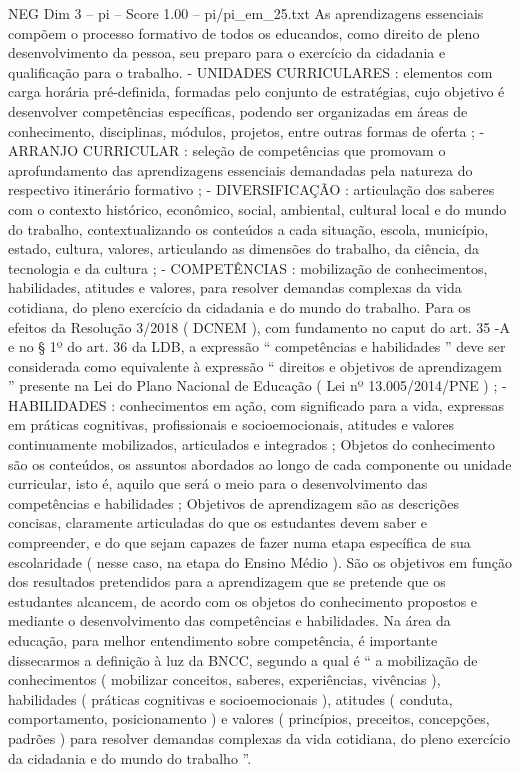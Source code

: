 \begin{textsample}{NEG Dim 3 – pi – Score 1.00 – pi/pi\_em\_25.txt}
As aprendizagens essenciais compõem o processo formativo de todos os educandos, como direito de pleno desenvolvimento da pessoa, seu preparo para o exercício da cidadania e qualificação para o trabalho. - UNIDADES CURRICULARES : elementos com carga horária pré-definida, formadas pelo conjunto de estratégias, cujo objetivo é desenvolver competências específicas, podendo ser organizadas em áreas de conhecimento, disciplinas, módulos, projetos, entre outras formas de oferta ; - ARRANJO CURRICULAR : seleção de competências que promovam o aprofundamento das aprendizagens essenciais demandadas pela natureza do respectivo itinerário formativo ; - DIVERSIFICAÇÃO : articulação dos saberes com o contexto histórico, econômico, social, ambiental, cultural local e do mundo do trabalho, contextualizando os conteúdos a cada situação, escola, município, estado, cultura, valores, articulando as dimensões do trabalho, da ciência, da tecnologia e da cultura ; - COMPETÊNCIAS : mobilização de conhecimentos, habilidades, atitudes e valores, para resolver demandas complexas da vida cotidiana, do pleno exercício da cidadania e do mundo do trabalho.
Para os efeitos da Resolução 3/2018 ( DCNEM ), com fundamento no caput do art. 35 -A e no § 1º do art. 36 da LDB, a expressão “ competências e habilidades ” deve ser considerada como equivalente à expressão “ direitos e objetivos de aprendizagem ” presente na Lei do Plano Nacional de Educação ( Lei nº 13.005/2014/PNE ) ; - HABILIDADES : conhecimentos em ação, com significado para a vida, expressas em práticas cognitivas, profissionais e socioemocionais, atitudes e valores continuamente mobilizados, articulados e integrados ; Objetos do conhecimento são os conteúdos, os assuntos abordados ao longo de cada componente ou unidade curricular, isto é, aquilo que será o meio para o desenvolvimento das competências e habilidades ; Objetivos de aprendizagem são as descrições concisas, claramente articuladas do que os estudantes devem saber e compreender, e do que sejam capazes de fazer numa etapa específica de sua escolaridade ( nesse caso, na etapa do Ensino Médio ).
São os objetivos em função dos resultados pretendidos para a aprendizagem que se pretende que os estudantes alcancem, de acordo com os objetos do conhecimento propostos e mediante o desenvolvimento das competências e habilidades.
Na área da educação, para melhor entendimento sobre competência, é importante dissecarmos a definição à luz da BNCC, segundo a qual é “ a mobilização de conhecimentos ( mobilizar conceitos, saberes, experiências, vivências ), habilidades ( práticas cognitivas e socioemocionais ), atitudes ( conduta, comportamento, posicionamento ) e valores ( princípios, preceitos, concepções, padrões ) para resolver demandas complexas da vida cotidiana, do pleno exercício da cidadania e do mundo do trabalho ”.

\end{textsample}
